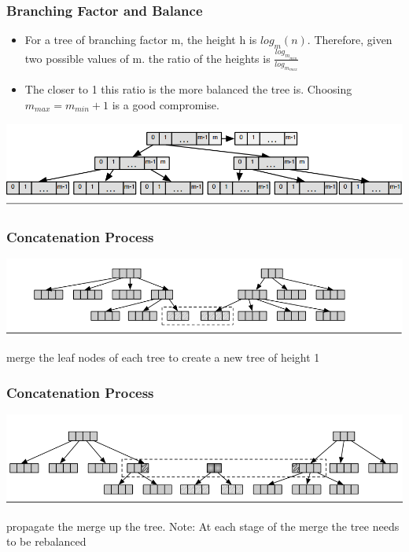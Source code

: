 \documentclass{beamer}
\begin{document}
\begin{frame}
\frametitle{Branching Factor and Balance}
	\begin{itemize}
		\item For a tree of branching factor m, the height h is $log_m (n)$. Therefore, given two possible values of m. the ratio of the heights is $\frac{log_{m_{min}}}{log_{m_{max}}}$ \pause
		\item The closer to 1 this ratio is the more balanced the tree is. Choosing $m_{max} = m_{min} + 1$ is a good compromise. \pause
	
	\end{itemize}
	
	\begin{center}
	
	\includegraphics[scale=0.25]{relaxedradixbalancedtree.png}
	
	\end{center}

\end{frame}
 
\begin{frame}
\frametitle{Concatenation Process}

	\begin{center}
	
	\includegraphics[scale=0.3]{concat1.png}
	
	\end{center}
	
	merge the leaf nodes of each tree to create a new tree of height 1

\end{frame}

\begin{frame}
\frametitle{Concatenation Process}

	\begin{center}
	
	\includegraphics[scale=0.3]{concat2.png}
	
	\end{center}
	
	propagate the merge up the tree. Note: At each stage of the merge the tree needs to be rebalanced

\end{frame}
\end{document}
